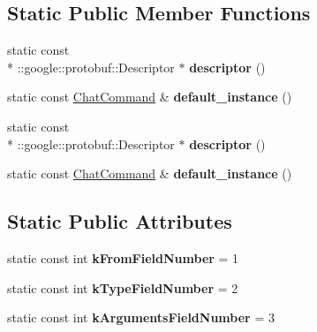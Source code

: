 \subsection*{Static Public Member Functions}
\begin{DoxyCompactItemize}
\item 
\hypertarget{classSimpleChat_1_1ChatCommand_a7fa6b5e76800d878d1b7fb1c28de4577}{static const \\*
\-::google\-::protobuf\-::\-Descriptor $\ast$ {\bfseries descriptor} ()}\label{classSimpleChat_1_1ChatCommand_a7fa6b5e76800d878d1b7fb1c28de4577}

\item 
\hypertarget{classSimpleChat_1_1ChatCommand_a096e3153360f14066c4b7f036c97059a}{static const \hyperlink{classSimpleChat_1_1ChatCommand}{Chat\-Command} \& {\bfseries default\-\_\-instance} ()}\label{classSimpleChat_1_1ChatCommand_a096e3153360f14066c4b7f036c97059a}

\item 
\hypertarget{classSimpleChat_1_1ChatCommand_a7fa6b5e76800d878d1b7fb1c28de4577}{static const \\*
\-::google\-::protobuf\-::\-Descriptor $\ast$ {\bfseries descriptor} ()}\label{classSimpleChat_1_1ChatCommand_a7fa6b5e76800d878d1b7fb1c28de4577}

\item 
\hypertarget{classSimpleChat_1_1ChatCommand_a096e3153360f14066c4b7f036c97059a}{static const \hyperlink{classSimpleChat_1_1ChatCommand}{Chat\-Command} \& {\bfseries default\-\_\-instance} ()}\label{classSimpleChat_1_1ChatCommand_a096e3153360f14066c4b7f036c97059a}

\end{DoxyCompactItemize}
\subsection*{Static Public Attributes}
\begin{DoxyCompactItemize}
\item 
\hypertarget{classSimpleChat_1_1ChatCommand_a93a29dfb07f32a6b7a518f408aaab85f}{static const int {\bfseries k\-From\-Field\-Number} = 1}\label{classSimpleChat_1_1ChatCommand_a93a29dfb07f32a6b7a518f408aaab85f}

\item 
\hypertarget{classSimpleChat_1_1ChatCommand_a1af836575f8e7d5fa96f275cd79dd318}{static const int {\bfseries k\-Type\-Field\-Number} = 2}\label{classSimpleChat_1_1ChatCommand_a1af836575f8e7d5fa96f275cd79dd318}

\item 
\hypertarget{classSimpleChat_1_1ChatCommand_a1b898a3e8b5650b5da3bd4d576ecd480}{static const int {\bfseries k\-Arguments\-Field\-Number} = 3}\label{classSimpleChat_1_1ChatCommand_a1b898a3e8b5650b5da3bd4d576ecd480}

\end{DoxyCompactItemize}
